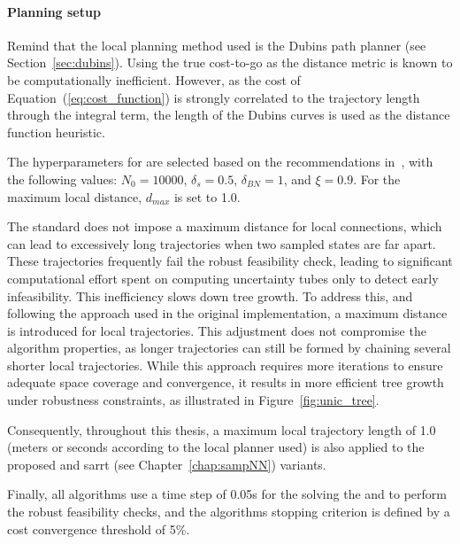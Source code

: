 \paragraph{Planning setup}

Remind that the local planning method used is the Dubins path planner (see Section~\ref{sec:dubins}). 
Using the true cost-to-go as the distance metric is known to be computationally inefficient. 
However, as the cost of Equation~(\ref{eq:cost_function}) is strongly correlated to the trajectory length through the integral term, the length of the Dubins curves is used as the distance function heuristic. 

The hyperparameters for  are selected based on the recommendations in~\cite{cSST}, with the following values: $N_0 = 10000$, $\delta_s = 0.5$, $\delta_{BN} = 1$, and $\xi = 0.9$.
For the maximum local distance, $d_{max}$ is set to 1.0.

The standard  does not impose a maximum distance for local connections, which can lead to excessively long trajectories when two sampled states are far apart.
These trajectories frequently fail the robust feasibility check, leading to significant computational effort spent on computing uncertainty tubes only to detect early infeasibility. 
This inefficiency slows down tree growth.
To address this, and following the approach used in the original  implementation, a maximum distance is introduced for local trajectories. 
This adjustment does not compromise the algorithm properties, as longer trajectories can still be formed by chaining several shorter local trajectories. 
While this approach requires more iterations to ensure adequate space coverage and convergence, it results in more efficient tree growth under robustness constraints, as illustrated in Figure~\ref{fig:unic_tree}.

Consequently, throughout this thesis, a maximum local trajectory length of 1.0 (meters or seconds according to the local planner used) is also applied to the proposed  and \gls{sarrt} (see Chapter~\ref{chap:sampNN}) variants.

Finally, all algorithms use a time step of 0.05s for the solving the  and to perform the robust feasibility checks, and the algorithms stopping criterion is defined by a cost convergence threshold of 5\%.

